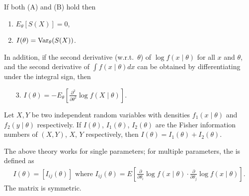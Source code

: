 \begin{theorem}
    If both (A) and (B) hold then
    \begin{enumerate}
        \item $E_{\theta} [S(X)] = 0$,
        \item $I(\theta) = \operatorname{Var}_{\theta}(S(X))$.
    \end{enumerate}
    In addition, if the second derivative (w.r.t.~$\theta$) of $\log f(x \mid \theta)$ for all $x$ and $\theta$, and the second derivative of $\int f(x \mid \theta) dx$ can be obtained by differentiating under the integral sign, then
    \begin{enumerate}
        \item[3.] $I(\theta) = -E_{\theta}[\frac{\partial^{2}}{\partial \theta^{2}} \log f(X \mid \theta)]$. 
    \end{enumerate}
\end{theorem}

\begin{theorem}
    Let $X,Y$ be two independent random variables with densities $f_{1}(x \mid \theta)$ and $f_{2}(y \mid \theta)$ respectively. If $I(\theta)$, $I_{1}(\theta)$, $I_{2}(\theta)$ are the Fisher information numbers of $(X,Y)$, $X$, $Y$ respectively, then $I(\theta) = I_{1}(\theta) + I_{2}(\theta)$.
\end{theorem}

The above theory works for single parameters; for multiple parameters, the  is defined as
\begin{align}
    I(\theta) = [I_{ij}(\theta)] \text{ where } I_{ij}(\theta) = E \left[ \frac{\partial}{\partial \theta_{i}} \log f(x \mid \theta) \cdot \frac{\partial}{\partial \theta_{j}} \log f(x \mid \theta) \right].
\end{align}
The matrix is symmetric.